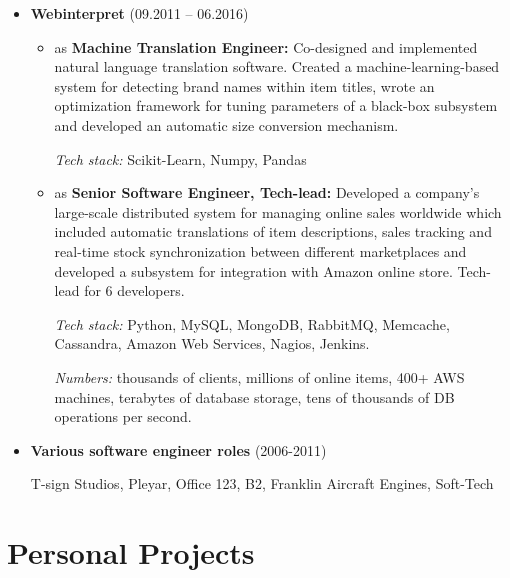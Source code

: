 \documentclass[12pt,a4paper]{article}
\begin{document}
\begin{itemize}[left=0pt]
  \textit{Tech stack:} PL/I, z/OS, IBM mainframe, DB2

  \item \textbf{Webinterpret} (09.2011 -- 06.2016)

  \begin{itemize}
    \item as \textbf{Machine Translation Engineer:} Co-designed and implemented natural language translation software. Created a machine-learning-based system for detecting brand names within item titles, wrote an optimization framework for tuning parameters of a black-box subsystem and developed an automatic size conversion mechanism.

    \textit{Tech stack:} Scikit-Learn, Numpy, Pandas

    \item as \textbf{Senior Software Engineer, Tech-lead:} Developed a company's large-scale distributed system for managing online sales worldwide which included automatic translations of item descriptions, sales tracking and real-time stock synchronization between different marketplaces and developed a subsystem for integration with Amazon online store. Tech-lead for 6 developers.

    \textit{Tech stack:} Python, MySQL, MongoDB, RabbitMQ, Memcache, Cassandra, Amazon Web Services, Nagios, Jenkins.

    \textit{Numbers:} thousands of clients, millions of online items, 400+ AWS machines, terabytes of database storage, tens of thousands of DB operations per second.
  \end{itemize}

  \item \textbf{Various software engineer roles} (2006-2011)

  T-sign Studios, Pleyar, Office 123, B2, Franklin Aircraft Engines, Soft-Tech
\end{itemize}

\section{Personal Projects}
\end{document}

